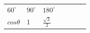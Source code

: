 {{\begin{center}
\begin{xtabular}[t]{|l|l|l|l|l|l|l|}
        
                  \begin{math}{60}^{\circ }\end{math}
                 &
    
    
        
                  \begin{math}{90}^{\circ }\end{math}
                 &
    
    
        
                  \begin{math}{180}^{\circ }\end{math}
     \tabularnewline{}
    
    
        
                  \begin{math}cos\theta \end{math}
                 &
    
    
        1 &
    
    
        
                  \begin{math}\frac{\sqrt{3}}{2}\end{math}
                 &
    

\end{xtabular}
\end{center}}}
